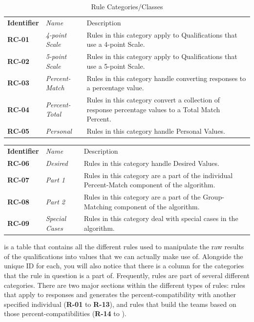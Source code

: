 \documentclass[12pt,letterpaper]{article}
\begin{document}
\begin{table}[H]
	\caption{Rule Categories/Classes}
	\begin{tabu} to 
	    \tableheader{}Identifier & Name & Description\\
		RC-01 & 4-point Scale & Rules in this category apply to Qualifications that use a 4-point Scale.\\
		RC-02 & 5-point Scale & Rules in this category apply to Qualifications that use a 5-point Scale.\\
		RC-03 & Percent-Match & Rules in this category handle converting responses to a percentage value.\\
		RC-04 & Percent-Total & Rules in this category convert a collection of response percentage values to a Total Match Percent.\\
		RC-05 & Personal & Rules in this category handle Personal Values. \\
		
	\end{tabu}
\end{table}

\begin{center}
\begin{tabu} to 
	    \tableheader{}Identifier & Name & Description\\
		RC-06 & Desired & Rules in this category handle Desired Values.\\
		RC-07 & Part 1 & Rules in this category are a part of the individual Percent-Match component of the algorithm.\\
		RC-08 & Part 2 & Rules in this category are a part of the Group-Matching component of the algorithm.\\
		RC-09 & Special Cases & Rules in this category deal with special cases in the algorithm.\\
\end{tabu}
\end{center}

 is a table that contains all the different rules used to manipulate the raw results of the qualifications into values that we can actually make use of. Alongside the unique ID for each, you will also notice that there is a column for the categories that the rule in question is a part of. Frequently, rules are part of several different categories. There are two major sections within the different types of rules: rules that apply to responses and generates the percent-compatibility with another specified individual ({\bf R-01} to {\bf R-13}), and rules that build the teams based on those percent-compatibilities ({\bf R-14} to {\bf }).
\end{document}
